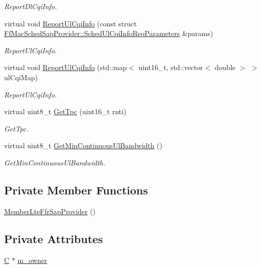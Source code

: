 \begin{DoxyCompactItemize}
\begin{DoxyCompactList}\small\item\em Report\+Dl\+Cqi\+Info. \end{DoxyCompactList}\item 
virtual void \hyperlink{classns3_1_1MemberLteFfrSapProvider_a80d055690d49cbfac74208a357d3e93c}{Report\+Ul\+Cqi\+Info} (const struct \hyperlink{structns3_1_1FfMacSchedSapProvider_1_1SchedUlCqiInfoReqParameters}{Ff\+Mac\+Sched\+Sap\+Provider\+::\+Sched\+Ul\+Cqi\+Info\+Req\+Parameters} \&params)
\begin{DoxyCompactList}\small\item\em Report\+Ul\+Cqi\+Info. \end{DoxyCompactList}\item 
virtual void \hyperlink{classns3_1_1MemberLteFfrSapProvider_a3882f4897cd2041f44eb2547075c9691}{Report\+Ul\+Cqi\+Info} (std\+::map$<$ uint16\+\_\+t, std\+::vector$<$ double $>$ $>$ ul\+Cqi\+Map)
\begin{DoxyCompactList}\small\item\em Report\+Ul\+Cqi\+Info. \end{DoxyCompactList}\item 
virtual uint8\+\_\+t \hyperlink{classns3_1_1MemberLteFfrSapProvider_a8e59a6eb07c83411ee3cc8c66df2693f}{Get\+Tpc} (uint16\+\_\+t rnti)
\begin{DoxyCompactList}\small\item\em Get\+Tpc. \end{DoxyCompactList}\item 
virtual uint8\+\_\+t \hyperlink{classns3_1_1MemberLteFfrSapProvider_a15def247bcd0af52681b600c7a47596a}{Get\+Min\+Continuous\+Ul\+Bandwidth} ()
\begin{DoxyCompactList}\small\item\em Get\+Min\+Continuous\+Ul\+Bandwidth. \end{DoxyCompactList}\end{DoxyCompactItemize}
\subsection*{Private Member Functions}
\begin{DoxyCompactItemize}
\item 
\hyperlink{classns3_1_1MemberLteFfrSapProvider_a7891e9822c51b86913a00b12be2e7f1d}{Member\+Lte\+Ffr\+Sap\+Provider} ()
\end{DoxyCompactItemize}
\subsection*{Private Attributes}
\begin{DoxyCompactItemize}
\item 
\hyperlink{loss__COST231__small__cities__urban_8m_aaa53ca0b650dfd85c4f59fa156f7a2cc}{C} $\ast$ \hyperlink{classns3_1_1MemberLteFfrSapProvider_a8df6d0a27a71c7cc99ae31095b000a12}{m\+\_\+owner}
\end{DoxyCompactItemize}


